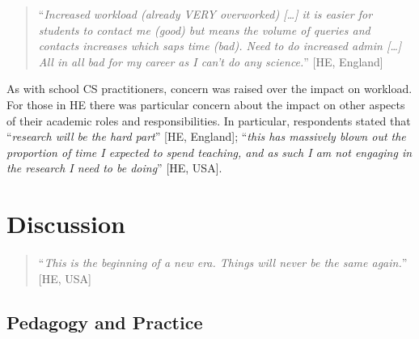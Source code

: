 \documentclass[conference]{IEEEtran}
\begin{document}
\begin{quotation}
``{\emph{Increased workload (already VERY overworked) […]  it is
easier for students to contact me (good) but means the volume of
queries and contacts increases which saps time (bad). Need to do
increased admin […] All in all bad for my career as I can’t do any
science.}}'' [HE, England]
\end{quotation}

As with school CS practitioners, concern was raised over the impact on
workload. For those in HE there was particular concern about the
impact on other aspects of their academic roles and
responsibilities. In particular, respondents stated that
``{\emph{research will be the hard part}}'' [HE, England]; ``{\emph{this has
massively blown out the proportion of time I expected to spend
teaching, and as such I am not engaging in the research I need to be
doing}}'' [HE, USA].


\section{Discussion}\label{discussion}


\begin{quotation}
``{\emph{This is the beginning of a new era. Things will never be the
same again.}}'' [HE, USA]
\end{quotation}


\subsection{Pedagogy and Practice}
\end{document}
